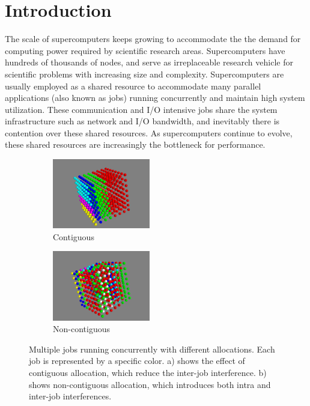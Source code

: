 \documentclass[conference]{IEEEtran}
\begin{document}
\IEEEpeerreviewmaketitle


\section{Introduction} 
\label{sec: intro}

The scale of supercomputers keeps growing to accommodate the the demand for computing power required by scientific research areas. Supercomputers have hundreds of thousands of nodes, and serve as irreplaceable research vehicle for scientific problems with increasing size and complexity. Supercomputers are usually employed as a shared resource to accommodate many parallel applications (also known as jobs) running concurrently \cite{zhou-ipdps} and maintain high system utilization. These communication and I/O intensive jobs share the system infrastructure such as network and I/O bandwidth, and inevitably there is contention over these shared resources. As supercomputers continue to evolve, these shared resources are increasingly the bottleneck for performance.


\begin{figure}[h!]
    \centering
    \begin{subfigure}[t]{0.2\textwidth}
        \centering
        \includegraphics[height=1.2in]{figs/goodallocation}
        \caption{Contiguous}
        \label{fig:overview_sub1}
    \end{subfigure}%
    \hspace{1em}%
    \begin{subfigure}[t]{0.2\textwidth}
        \centering
        \includegraphics[height=1.2in]{figs/badallocation}
        \caption{Non-contiguous}
        \label{fig:overview_sub2}
    \end{subfigure}%
   \caption{Multiple jobs running concurrently with different allocations. Each job is represented by a specific color. a) shows the effect of contiguous allocation, which reduce the inter-job interference. b) shows non-contiguous allocation, which introduces both intra and inter-job interferences. }
   \label{fig:overview}
\end{figure}
\end{document}
